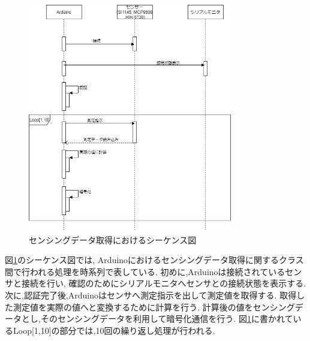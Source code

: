 \begin{figure}[H]
\begin{center}
	\includegraphics[height=100mm]{sensor_sequence.png}
	\caption{センシングデータ取得におけるシーケンス図}
	\label{fig:sensor_sequence}
\end{center}
\end{figure}

図\ref{fig:sensor_sequence}のシーケンス図では,
Arduinoにおけるセンシングデータ取得に関するクラス間で行われる処理を時系列で表している.
初めに,Arduinoは接続されているセンサと接続を行い,
確認のためにシリアルモニタへセンサとの接続状態を表示する.
次に,認証完了後,Arduinoはセンサへ測定指示を出して測定値を取得する.
取得した測定値を実際の値へと変換するために計算を行う.
計算後の値をセンシングデータとし,そのセンシングデータを利用して暗号化通信を行う.
図\ref{fig:sensor_sequence}に書かれているLoop[1,10]の部分では,10回の繰り返し処理が行われる.

